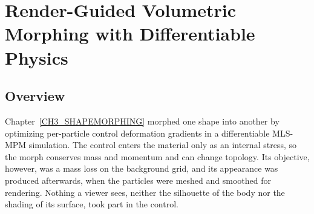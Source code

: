 
\clearpage %
\chapter{Render-Guided Volumetric Morphing with Differentiable Physics}\label{CH4_PhysMorphGS}
\setlength{\emergencystretch}{1.5em}

\section{Overview}
\label{ch4:sec_overview}

Chapter~\ref{CH3_SHAPEMORPHING} morphed one shape into another by optimizing per-particle control deformation
gradients in a differentiable MLS-MPM simulation. The control enters the material only as an internal stress, so the
morph conserves mass and momentum and can change topology. Its objective, however, was a mass loss on the background
grid, and its appearance was produced afterwards, when the particles were meshed and smoothed for rendering. Nothing a
viewer sees, neither the silhouette of the body nor the shading of its surface, took part in the control.

